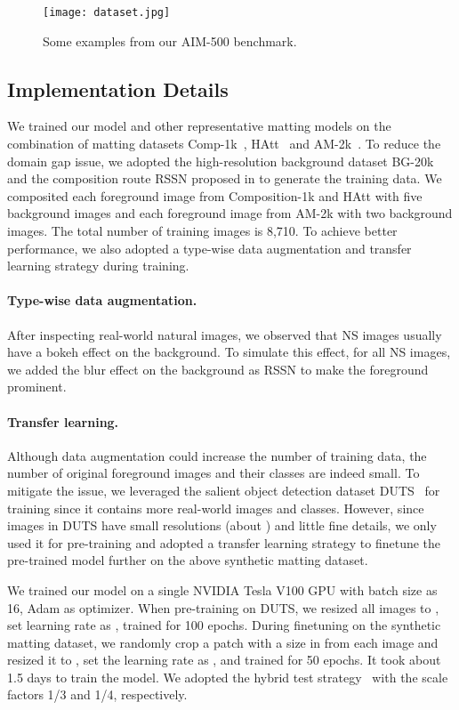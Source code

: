 \documentclass{article}
\begin{document}
\begin{figure}[t]
    \texttt{[image: dataset.jpg]}
    \caption{Some examples from our AIM-500 benchmark.}
    \label{fig:dataset}
\end{figure}


\subsection{Implementation Details}

We trained our model and other representative matting models on the combination of matting datasets Comp-1k~\cite{xu2017deep}, HAtt~\cite{Qiao_2020_CVPR} and AM-2k~\cite{gfm}. To reduce the domain gap issue, we adopted the high-resolution background dataset BG-20k and the composition route RSSN proposed in \cite{gfm} to generate the training data. We composited each foreground image from Composition-1k and HAtt with five background images and each foreground image from AM-2k with two background images. The total number of training images is 8,710. To achieve better performance, we also adopted a type-wise data augmentation and transfer learning strategy during training.

\paragraph{Type-wise data augmentation.}After inspecting real-world natural images, we observed that NS images usually have a bokeh effect on the background. To simulate this effect, for all NS images, we added the blur effect on the background as RSSN to make the foreground prominent.

\paragraph{Transfer learning.}Although data augmentation could increase the number of training data, the number of original foreground images and their classes are indeed small. To mitigate the issue, we leveraged the salient object detection dataset DUTS~\cite{duts} for training since it contains more real-world images and classes. However, since images in DUTS have small resolutions (about ) and little fine details, we only used it for pre-training and adopted a transfer learning strategy to finetune the pre-trained model further on the above synthetic matting dataset.


We trained our model on a single NVIDIA Tesla V100 GPU with batch size as 16, Adam as optimizer. When pre-training on DUTS, we resized all images to , set learning rate as , trained for 100 epochs. During finetuning on the synthetic matting dataset, we randomly crop a patch with a size in  from each image and resized it to , set the learning rate as , and trained for 50 epochs. It took about 1.5 days to train the model. We adopted the hybrid test strategy~\cite{gfm} with the scale factors 1/3 and 1/4, respectively.
\end{document}
